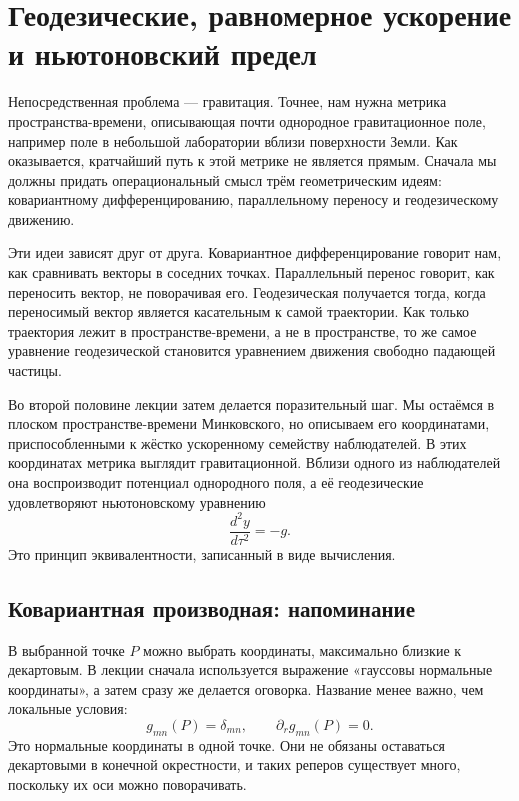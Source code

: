 \chapter{Геодезические, равномерное ускорение и ньютоновский предел}

Непосредственная проблема — гравитация. Точнее, нам нужна метрика пространства-времени, описывающая почти однородное гравитационное поле, например поле в небольшой лаборатории вблизи поверхности Земли. Как оказывается, кратчайший путь к этой метрике не является прямым. Сначала мы должны придать операциональный смысл трём геометрическим идеям: ковариантному дифференцированию, параллельному переносу и геодезическому движению.

Эти идеи зависят друг от друга. Ковариантное дифференцирование говорит нам, как сравнивать векторы в соседних точках. Параллельный перенос говорит, как переносить вектор, не поворачивая его. Геодезическая получается тогда, когда переносимый вектор является касательным к самой траектории. Как только траектория лежит в пространстве-времени, а не в пространстве, то же самое уравнение геодезической становится уравнением движения свободно падающей частицы.

Во второй половине лекции затем делается поразительный шаг. Мы остаёмся в плоском пространстве-времени Минковского, но описываем его координатами, приспособленными к жёстко ускоренному семейству наблюдателей. В этих координатах метрика выглядит гравитационной. Вблизи одного из наблюдателей она воспроизводит потенциал однородного поля, а её геодезические удовлетворяют ньютоновскому уравнению
\begin{equation}
\frac{d^2y}{d\tau^2}=-g.
\end{equation}
Это принцип эквивалентности, записанный в виде вычисления.

\section{Ковариантная производная: напоминание}

В выбранной точке \(P\) можно выбрать координаты, максимально близкие к декартовым. В лекции сначала используется выражение «гауссовы нормальные координаты», а затем сразу же делается оговорка. Название менее важно, чем локальные условия:
\begin{equation}
g_{mn}(P)=\delta_{mn},
\qquad
\partial_r g_{mn}(P)=0.
\label{eq:l4-normal-point}
\end{equation}
Это нормальные координаты в одной точке. Они не обязаны оставаться декартовыми в конечной окрестности, и таких реперов существует много, поскольку их оси можно поворачивать.

